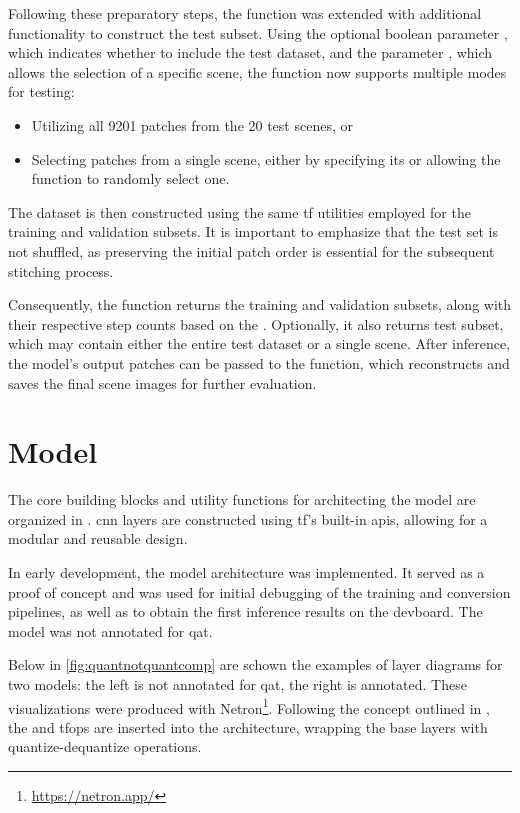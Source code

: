 {Following these preparatory steps, the  function was extended with additional functionality to construct the test subset.
Using the optional boolean parameter , which indicates whether to include the test dataset, and the parameter ,
which allows the selection of a specific scene, the function now supports multiple modes for testing:

\begin{itemize}
    \item Utilizing all 9201 patches from the 20 test scenes, or
    \item Selecting patches from a single scene, either by specifying its  or allowing the function to randomly select one.
\end{itemize}

The dataset is then constructed using the same \gls{tf} utilities employed for the training and validation subsets.
It is important to emphasize that the test set is not shuffled, as preserving the initial patch order is essential for the subsequent stitching process.

Consequently, the  function returns the training and validation subsets, along with their respective step counts based on the .
Optionally, it also returns test subset, which may contain either the entire test dataset or a single scene.
After inference, the model's output patches can be passed to the  function, which reconstructs and saves the final scene images for further evaluation.

\clearpage
\section{Model}
\label{sec:model}

The core building blocks and utility functions for architecting the model are organized in .
\gls{cnn} layers are constructed using \gls{tf}'s built-in \glspl{api}, allowing for a modular and reusable design.

In early development, the  model architecture was implemented.
It served as a proof of concept and was used for initial debugging of the training and conversion pipelines, as well as to obtain the first inference results on the \gls{devboard}.
The model was not annotated for \gls{qat}.

Below in \autoref{fig:quantnotquantcomp} are schown the examples of layer diagrams for two models: the left is not annotated for \gls{qat}, the right is annotated.
These visualizations were produced with Netron\footnote{\url{https://netron.app/}}.
Following the concept outlined in , the  and  \glspl{tfop} are inserted into the architecture,
wrapping the base layers with quantize-dequantize operations.

}
